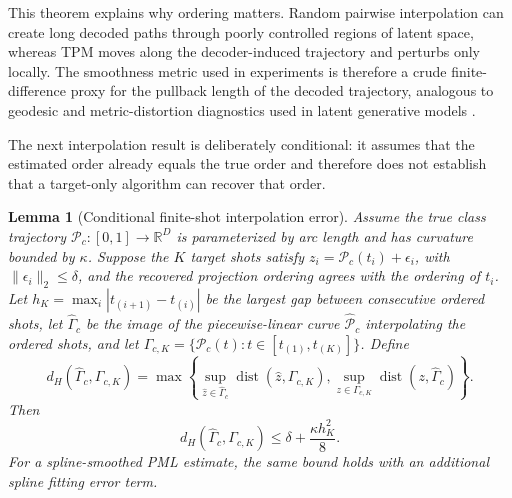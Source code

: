 \documentclass{article}
\newtheorem{lemma}{Lemma}
\begin{document}
This theorem explains why ordering matters. Random pairwise interpolation can create long decoded paths through poorly controlled regions of latent space, whereas TPM moves along the decoder-induced trajectory and perturbs only locally. The smoothness metric used in experiments is therefore a crude finite-difference proxy for the pullback length of the decoded trajectory, analogous to geodesic and metric-distortion diagnostics used in latent generative models \citep{hauberg2015principal, arvanitidis2018latent, shao2018riemannian}.

The next interpolation result is deliberately conditional: it assumes that the estimated order already equals the true order and therefore does not establish that a target-only algorithm can recover that order.

\begin{lemma}[Conditional finite-shot interpolation error]
	Assume the true class trajectory $\mathcal{P}_c:[0,1]\rightarrow\mathbb{R}^D$ is parameterized by arc length and has curvature bounded by $\kappa$. Suppose the $K$ target shots satisfy $z_i=\mathcal{P}_c(t_i)+\epsilon_i$, with $\lVert\epsilon_i\rVert_2\le\delta$, and the recovered projection ordering agrees with the ordering of $t_i$. Let $h_K=\max_i |t_{(i+1)}-t_{(i)}|$ be the largest gap between consecutive ordered shots, let $\widehat{\Gamma}_c$ be the image of the piecewise-linear curve $\widehat{\mathcal{P}}_c$ interpolating the ordered shots, and let $\Gamma_{c,K}=\{\mathcal{P}_c(t):t\in[t_{(1)},t_{(K)}]\}$. Define
	\[
	d_H(\widehat{\Gamma}_c,\Gamma_{c,K})
	=
	\max\left\{
	\sup_{\hat z\in\widehat{\Gamma}_c}\operatorname{dist}(\hat z,\Gamma_{c,K}),
	\sup_{z\in\Gamma_{c,K}}\operatorname{dist}(z,\widehat{\Gamma}_c)
	\right\}.
	\]
	Then
	\[
	d_H(\widehat{\Gamma}_c,\Gamma_{c,K})
	\le \delta+\frac{\kappa h_K^2}{8}.
	\]
	For a spline-smoothed PML estimate, the same bound holds with an additional spline fitting error term.
\end{lemma}
\end{document}
